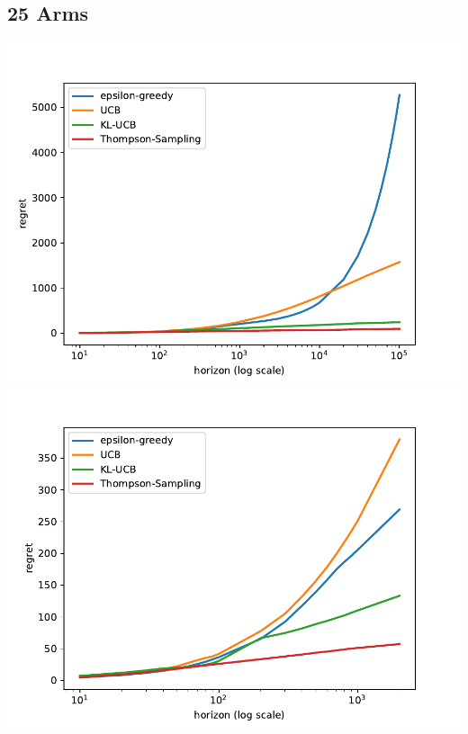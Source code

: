 \documentclass[11pt]{article}
\begin{document}
\subsection{25 Arms}
\begin{center}
\includegraphics[width=15cm]{arms_25.pdf}
\includegraphics[width=15cm]{arms_25_zoom.pdf}
\end{center}
\end{document}
